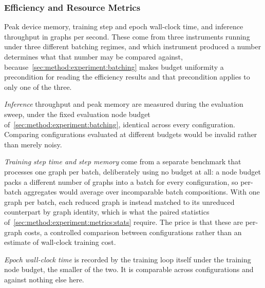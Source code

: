 \subsubsection{Efficiency and Resource Metrics}
\label{sec:method:experiment:metrics:efficiency}
Peak device memory, training step and epoch wall-clock time, and inference throughput in
graphs per second. These come from three instruments running under three different batching
regimes, and which instrument produced a number determines what that number may be compared
against, because~\ref{sec:method:experiment:batching} makes budget uniformity a
precondition for reading the efficiency results and that precondition applies to only one
of the three.

\emph{Inference} throughput and peak memory are measured during the evaluation sweep, under
the fixed evaluation node budget of~\ref{sec:method:experiment:batching}, identical across
every configuration. Comparing configurations evaluated at different budgets would be
invalid rather than merely noisy.

\emph{Training step time and step memory} come from a separate benchmark that processes one
graph per batch, deliberately using no budget at all: a node budget packs a different
number of graphs into a batch for every configuration, so per-batch aggregates would
average over incomparable batch compositions. With one graph per batch, each reduced graph
is instead matched to its unreduced counterpart by graph identity, which is what the paired
statistics of~\ref{sec:method:experiment:metrics:stats} require. The price is that these
are per-graph costs, a controlled comparison between configurations rather than an estimate
of wall-clock training cost.

\emph{Epoch wall-clock time} is recorded by the training loop itself under the training
node budget, the smaller of the two. It is comparable across configurations and against
nothing else here.

